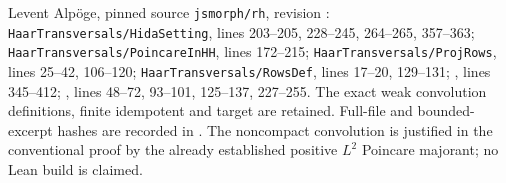 Levent Alp\"oge, pinned source \texttt{jsmorph/rh}, revision
:
\texttt{HaarTransversals/HidaSetting}, lines 203--205, 228--245,
264--265, 357--363;
\texttt{HaarTransversals/PoincareInHH}, lines 172--215;
\texttt{HaarTransversals/ProjRows}, lines 25--42, 106--120;
\texttt{HaarTransversals/RowsDef}, lines 17--20, 129--131;
,
lines 345--412;
,
lines 48--72, 93--101, 125--137, 227--255.
The exact weak convolution definitions, finite idempotent and
target are retained.  Full-file and bounded-excerpt hashes are
recorded in .
The noncompact convolution is justified in the conventional proof
by the already established positive $L^2$ Poincare majorant;
no Lean build is claimed.
